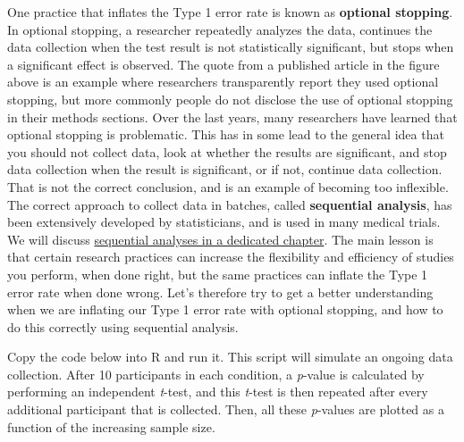 \documentclass[
  oneside]{book}
\begin{document}
One practice that inflates the Type 1 error rate is known as \textbf{optional stopping}. In optional stopping, a researcher repeatedly analyzes the data, continues the data collection when the test result is not statistically significant, but stops when a significant effect is observed. The quote from a published article in the figure above is an example where researchers transparently report they used optional stopping, but more commonly people do not disclose the use of optional stopping in their methods sections. Over the last years, many researchers have learned that optional stopping is problematic. This has in some lead to the general idea that you should not collect data, look at whether the results are significant, and stop data collection when the result is significant, or if not, continue data collection. That is not the correct conclusion, and is an example of becoming too inflexible. The correct approach to collect data in batches, called \textbf{sequential analysis}, has been extensively developed by statisticians, and is used in many medical trials. We will discuss \protect\hyperlink{sequential}{sequential analyses in a dedicated chapter}. The main lesson is that certain research practices can increase the flexibility and efficiency of studies you perform, when done right, but the same practices can inflate the Type 1 error rate when done wrong. Let's therefore try to get a better understanding when we are inflating our Type 1 error rate with optional stopping, and how to do this correctly using sequential analysis.

Copy the code below into R and run it. This script will simulate an ongoing data collection. After 10 participants in each condition, a \emph{p}-value is calculated by performing an independent \emph{t}-test, and this \emph{t}-test is then repeated after every additional participant that is collected. Then, all these \emph{p}-values are plotted as a function of the increasing sample size.
\end{document}
